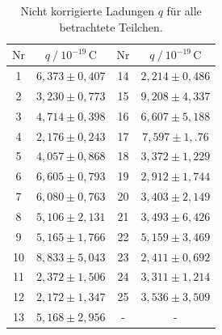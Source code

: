 \begin{table}[H]
  \centering
  \caption{Nicht korrigierte Ladungen $q$ für alle betrachtete Teilchen.}
  \label{tab:ladungennichtkorr}
  \begin{tabular}{S S S S}
    \toprule
      {$\text{Nr}$} & {$q \mathbin{/} 10^{-19} \, \unit{\coulomb}$} & {$\text{Nr}$} & {$q \mathbin{/} 10^{-19} \,\unit{\coulomb}$}\\
          &     {$6,373 \pm 0,407$}     &     14      &     {$2,214 \pm 0,486$}      \\
     2      &     {$3,230 \pm 0,773$}     &     15      &     {$9,208 \pm 4,337$}      \\
     3      &     {$4,714 \pm 0,398$}     &     16      &     {$6,607 \pm 5,188$}      \\
     4      &     {$2,176 \pm 0,243$}     &     17      &     {$7,597 \pm 1,.76$}      \\
     5      &     {$4,057 \pm 0,868$}     &     18      &     {$3,372 \pm 1,229$}      \\
     6      &     {$6,605 \pm 0,793$}     &     19      &     {$2,912 \pm 1,744$}      \\
     7      &     {$6,080 \pm 0,763$}     &     20      &     {$3,403 \pm 2,149$}      \\
     8      &     {$5,106 \pm 2,131$}     &     21      &     {$3,493 \pm 6,426$}      \\
     9      &     {$5,165 \pm 1,766$}     &     22      &     {$5,159 \pm 3,469$}      \\
    10      &     {$8,833 \pm 5,043$}     &     23      &     {$2,411 \pm 0,692$}      \\
    11      &     {$2,372 \pm 1,506$}     &     24      &     {$3,311 \pm 1,214$}      \\
    12      &     {$2,172 \pm 1,347$}     &     25      &     {$3,536 \pm 3,509$}      \\
    13      &     {$5,168 \pm 2,956$}     &     {-}     &               {-}                \\
    \bottomrule
  \end{tabular}
\end{table}

